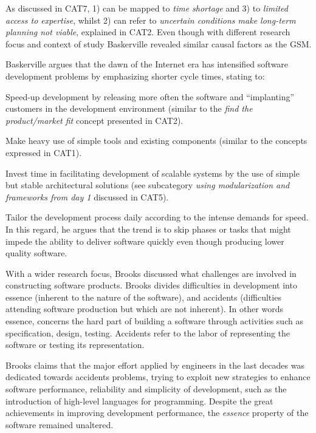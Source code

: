 \documentclass[10pt,journal,letterpaper,compsoc]{IEEEtran}
\begin{document}
As discussed in CAT7, 1) can be mapped to \textit{time shortage} and 3) to \textit{limited access to expertise}, whilst  2) can refer to \textit{uncertain conditions make long-term planning not viable}, explained in CAT2. Even though with different research focus and context of study %
 Baskerville revealed similar causal factors as the GSM.

Baskerville argues that the dawn of the Internet era has intensified software development problems by emphasizing shorter cycle times, stating to:

\begin{compactitem}
\item Speed-up development by releasing more often the software and ``implanting'' customers in the development environment (similar to the \textit{find the product/market fit} concept presented in CAT2). 
\item Make heavy use of simple tools and existing components (similar to the concepts expressed in CAT1).
\item Invest time in facilitating development of scalable systems by the use of simple but stable architectural solutions (see subcategory \textit{using modularization and frameworks from day 1} discussed in CAT5). 
\item Tailor the development process daily according to the intense demands for speed. In this regard, he argues that the trend is to skip phases or tasks that might impede the ability to deliver software quickly even though producing lower quality software.
  

\end{compactitem}


With a wider research focus, Brooks \cite{BrooksJr1987} discussed what challenges are involved in constructing software products. Brooks divides difficulties in development into essence (inherent to the nature of the software), and accidents (difficulties attending software production but which are not inherent). In other words essence, concerns the hard part of building a software through activities such as specification, design, testing. Accidents refer to the labor of representing the software or testing its representation.

Brooks claims that the major effort applied by engineers in the last decades was dedicated towards accidents problems, trying to exploit new strategies to enhance software performance, reliability and simplicity of development, such as the introduction of high-level languages for programming.  Despite the great achievements in improving development performance, the \textit{essence} property of the software remained unaltered.
\end{document}
